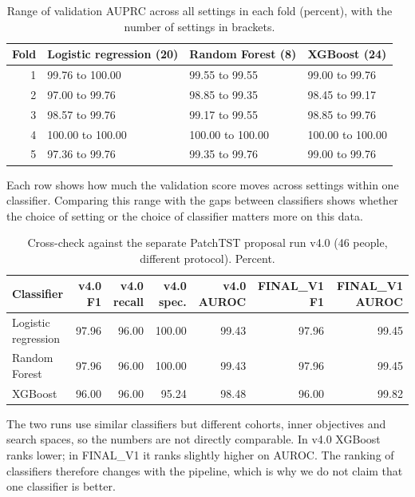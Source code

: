 \documentclass[11pt,a4paper]{article}
\begin{document}
\begin{table}[H]\centering\footnotesize\renewcommand{\arraystretch}{1.15}
\caption{Range of validation AUPRC across all settings in each fold (percent), with the number of settings in brackets.}
\begin{tabular}{rlll}
\toprule
\textbf{Fold} & \textbf{Logistic regression (20)} & \textbf{Random Forest (8)} & \textbf{XGBoost (24)}\\
\midrule
1 & 99.76 to 100.00 & 99.55 to 99.55 & 99.00 to 99.76\\
2 & 97.00 to 99.76 & 98.85 to 99.35 & 98.45 to 99.17\\
3 & 98.57 to 99.76 & 99.17 to 99.55 & 98.85 to 99.76\\
4 & 100.00 to 100.00 & 100.00 to 100.00 & 100.00 to 100.00\\
5 & 97.36 to 99.76 & 99.35 to 99.76 & 99.00 to 99.76\\
\bottomrule
\end{tabular}\end{table}
Each row shows how much the validation score moves across settings within one classifier. Comparing this range with the gaps between classifiers shows whether the choice of setting or the choice of classifier matters more on this data.

\begin{table}[H]\centering\footnotesize\renewcommand{\arraystretch}{1.15}
\caption{Cross-check against the separate PatchTST proposal run v4.0 (46 people, different protocol). Percent.}
\begin{tabular}{lrrrrrr}
\toprule
\textbf{Classifier} & \textbf{v4.0 F1} & \textbf{v4.0 recall} & \textbf{v4.0 spec.} & \textbf{v4.0 AUROC} & \textbf{FINAL\_V1 F1} & \textbf{FINAL\_V1 AUROC}\\
\midrule
Logistic regression & 97.96 & 96.00 & 100.00 & 99.43 & 97.96 & 99.45\\
Random Forest & 97.96 & 96.00 & 100.00 & 99.43 & 97.96 & 99.45\\
XGBoost & 96.00 & 96.00 & 95.24 & 98.48 & 96.00 & 99.82\\
\bottomrule
\end{tabular}\end{table}
The two runs use similar classifiers but different cohorts, inner objectives and search spaces, so the numbers are not directly comparable. In v4.0 XGBoost ranks lower; in FINAL\_V1 it ranks slightly higher on AUROC. The ranking of classifiers therefore changes with the pipeline, which is why we do not claim that one classifier is better.
\end{document}
